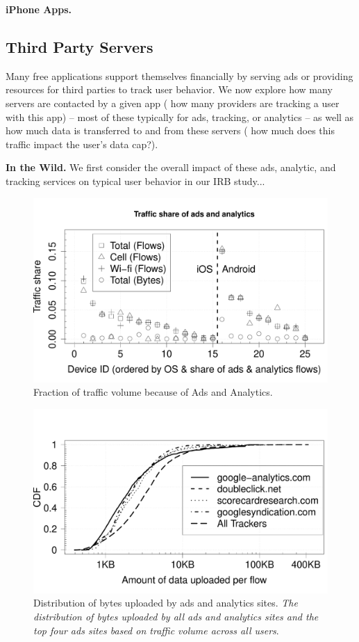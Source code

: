   {\bf iPhone Apps.}

\subsection{Third Party Servers}
  Many free applications support themselves financially by serving ads or providing resources for third parties to track user behavior.
  We now explore how many servers are contacted by a given app (\ie{} how many providers are tracking a user with this app) -- most of these typically for ads, tracking, or analytics -- as well as how much data is transferred to and from these servers (\ie{} how much does this traffic impact the user's data cap?).

  {\bf In the Wild.}
  We first consider the overall impact of these ads, analytic, and tracking services on typical user behavior in our IRB study...

\begin{figure}
\includegraphics[width=\columnwidth]{plots/ad_share_bytes.pdf}
\caption{Fraction of traffic volume because of Ads and Analytics. \emph{}}
\label{fig:description}
\end{figure}

\begin{figure}
\includegraphics[width=\columnwidth]{plots/distrib_ad_uploads.pdf}
\caption{Distribution of bytes uploaded by ads and analytics sites. \emph{The distribution of bytes uploaded by all ads and analytics sites and the top four ads sites based on traffic volume across all users}.}
\label{fig:description}
\end{figure}

